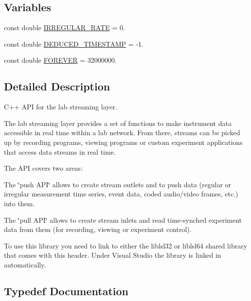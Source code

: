 \subsection*{Variables}
\begin{DoxyCompactItemize}
\item 
const double \hyperlink{namespacelsl_ac7ebddefe1091ef2d9459b6f9d79f7ab}{I\+R\+R\+E\+G\+U\+L\+A\+R\+\_\+\+R\+A\+TE} = 0.
\item 
const double \hyperlink{namespacelsl_a57df17d8a2563a18b8b759a0cec696cc}{D\+E\+D\+U\+C\+E\+D\+\_\+\+T\+I\+M\+E\+S\+T\+A\+MP} = -\/1.
\item 
const double \hyperlink{namespacelsl_a74cfbc9077aca21295117217249721ed}{F\+O\+R\+E\+V\+ER} = 32000000.
\end{DoxyCompactItemize}


\subsection{Detailed Description}
C++ A\+PI for the lab streaming layer.

The lab streaming layer provides a set of functions to make instrument data accessible in real time within a lab network. From there, streams can be picked up by recording programs, viewing programs or custom experiment applications that access data streams in real time.

The A\+PI covers two areas\+:
\begin{DoxyItemize}
\item The \char`\"{}push A\+P\+I\char`\"{} allows to create stream outlets and to push data (regular or irregular measurement time series, event data, coded audio/video frames, etc.) into them.
\item The \char`\"{}pull A\+P\+I\char`\"{} allows to create stream inlets and read time-\/synched experiment data from them (for recording, viewing or experiment control).
\end{DoxyItemize}

To use this library you need to link to either the liblsl32 or liblsl64 shared library that comes with this header. Under Visual Studio the library is linked in automatically. 

\subsection{Typedef Documentation}
\mbox{\label{namespacelsl_ab09ea0488f986f056322c3c866dc0a0f}} 
